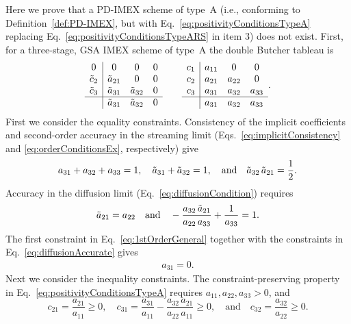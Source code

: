 Here we prove that a PD-IMEX scheme  of type~A (i.e., conforming to Definition~\ref{def:PD-IMEX}, but with Eq.~\eqref{eq:positivityConditionsTypeA} replacing Eq.~\eqref{eq:positivityConditionsTypeARS} in item 3) does not exist.  
First, for a three-stage, GSA IMEX scheme of type~A the double Butcher tableau is
\begin{equation*}
  \begin{array}{c | c c c}
  	      0       & 0              & 0              & 0 \\
  	\tilde{c}_{2} & \tilde{a}_{21} & 0              & 0 \\
  	\tilde{c}_{3} & \tilde{a}_{31} & \tilde{a}_{32} & 0 \\ \hline
  	              & \tilde{a}_{31} & \tilde{a}_{32} & 0
  \end{array}
  \qquad
  \begin{array}{c | c c c}
    c_{1} & a_{11} & 0      & 0      \\
  	c_{2} & a_{21} & a_{22} & 0      \\
  	c_{3} & a_{31} & a_{32} & a_{33} \\ \hline
  	      & a_{31} & a_{32} & a_{33}
  \end{array}.
\end{equation*}
First we consider the equality constraints.  
Consistency of the implicit coefficients and second-order accuracy in the streaming limit (Eqs.~\eqref{eq:implicitConsistency} and \eqref{eq:orderConditionsEx}, respectively) give
\begin{align}
  a_{31} + a_{32} + a_{33} = 1, \quad \tilde{a}_{31} + \tilde{a}_{32} = 1, \quad \text{and}\quad \tilde{a}_{32}\,\tilde{a}_{21} =  \frac{1}{2}.
  \label{eq:1stOrderGeneral}
\end{align}
Accuracy in the diffusion limit (Eq.~\eqref{eq:diffusionCondition}) requires 
\begin{align}
  \tilde{a}_{21} = a_{22}
  \quad\text{and}\quad 
  -\frac{a_{32}\,\tilde{a}_{21}}{a_{22}\,a_{33}} + \frac{1}{a_{33}} = 1.
\label{eq:diffusionAccurate}
\end{align}
The first constraint in Eq.~\eqref{eq:1stOrderGeneral} together with the constraints in Eq.~\eqref{eq:diffusionAccurate} gives
\begin{align}
  a_{31} = 0.
  \label{eq:a31is0}
\end{align}
Next we consider the inequality constraints.  
The constraint-preserving property in Eq.~\eqref{eq:positivityConditionsTypeA} requires $a_{11}, a_{22}, a_{33}>0$, and 
\begin{equation}
  c_{21} = \frac{a_{21}}{a_{11}} \geq 0, \quad
  c_{31} = \frac{a_{31}}{a_{11}} - \frac{a_{32}\,a_{21}}{a_{22}\,a_{11}} \geq 0, \quad\text{and}\quad
  c_{32} = \frac{a_{32}}{a_{22}} \geq 0.
  \label{eq:constraintsTypeA}
\end{equation}
